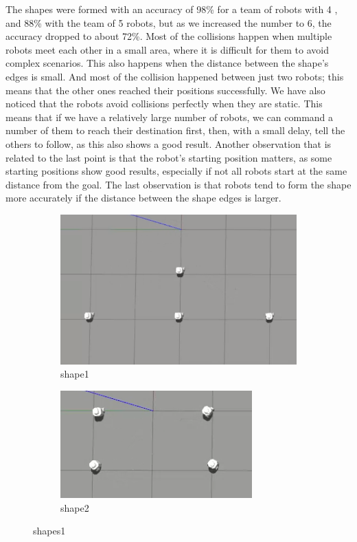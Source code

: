 \documentclass[12pt]{extarticle}
\begin{document}
The shapes were formed with an accuracy of 98\% for a team of robots with 4 , and 88\% with the team of  5 robots, but as we increased the number to 6, the accuracy dropped to about 72\%.
Most of the collisions happen when multiple robots meet each other in a small area, where it is difficult for them to avoid complex scenarios. This also happens when the distance between the shape's edges is small.
And most of the collision happened between just two robots; this means that the other ones reached their positions successfully. We have also noticed that the robots avoid collisions perfectly when they are static. This means that if we have a relatively large number of robots, we can command a number of them to reach their destination first, then, with a small delay, tell the others to follow, as this also shows a good result.
Another observation that is related to the last point is that the robot's starting position matters, as some starting positions show good results, especially if not all robots start at the same distance from the goal. The last observation is that robots tend to form the shape more accurately if the distance between the shape edges is larger.
 



\begin{figure}[H]
\centering
\begin{subfigure}{.5\textwidth}
  \centering
  \includegraphics[width=.8\linewidth]{shape1}
  \caption{shape1}
  \label{fig:sub1}
\end{subfigure}%
\begin{subfigure}{.5\textwidth}
  \centering
  \includegraphics[width=.8\linewidth]{shape2}
  \caption{shape2}
  \label{fig:sub2}
\end{subfigure}
\caption{shapes1}
\label{fig:test}



\end{figure}
\end{document}
